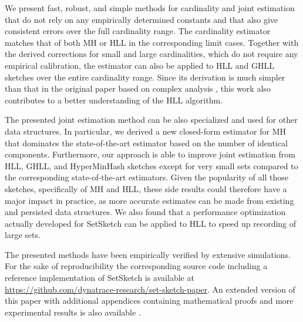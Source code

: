 \documentclass[sigconf, nonacm]{acmart}
\begin{document}
We present fast, robust, and simple methods for cardinality and joint estimation that do not rely on any empirically determined constants and that also give consistent errors over the full cardinality range. The cardinality estimator matches that of both \ac{MH} or \ac{HLL} in the corresponding limit cases. Together with the derived corrections for small and large cardinalities, which do not require any empirical calibration, the estimator can also be applied to \ac{HLL} and \ac{GHLL} sketches over the entire cardinality range. Since its derivation is much simpler than that in the original paper based on complex analysis \cite{Flajolet2007}, this work also contributes to a better understanding of the \ac{HLL} algorithm.

The presented joint estimation method can be also specialized and used for other data structures. In particular, we derived a new closed-form estimator for \ac{MH} that dominates the state-of-the-art estimator based on the number of identical components. Furthermore, our approach is able to improve joint estimation from \ac{HLL}, \ac{GHLL}, and HyperMinHash sketches except for very small sets compared to the corresponding state-of-the-art estimators. Given the popularity of all those sketches, specifically of \ac{MH} and \ac{HLL}, these side results could therefore have a major impact in practice, as more accurate estimates can be made from existing and persisted data structures. We also found that a performance optimization actually developed for SetSketch can be applied to \ac{HLL} to speed up recording of large sets.

The presented methods have been empirically verified by extensive simulations. For the sake of reproducibility the corresponding source code including a reference implementation of SetSketch is available at \url{https://github.com/dynatrace-research/set-sketch-paper}. An extended version of this paper with additional appendices containing mathematical proofs and more experimental results is also available \cite{Ertl2021}.
\end{document}

